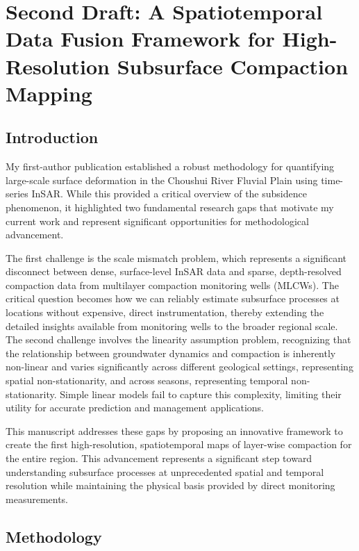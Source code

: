 \documentclass[12pt, a4paper]{article}
\begin{document}
	\section{Second Draft: A Spatiotemporal Data Fusion Framework for High-Resolution Subsurface Compaction Mapping}
	
	\subsection{Introduction}
	
	My first-author publication established a robust methodology for quantifying large-scale surface deformation in the Choushui River Fluvial Plain using time-series InSAR. While this provided a critical overview of the subsidence phenomenon, it highlighted two fundamental research gaps that motivate my current work and represent significant opportunities for methodological advancement.
	
	The first challenge is the scale mismatch problem, which represents a significant disconnect between dense, surface-level InSAR data and sparse, depth-resolved compaction data from multilayer compaction monitoring wells (MLCWs). The critical question becomes how we can reliably estimate subsurface processes at locations without expensive, direct instrumentation, thereby extending the detailed insights available from monitoring wells to the broader regional scale. The second challenge involves the linearity assumption problem, recognizing that the relationship between groundwater dynamics and compaction is inherently non-linear and varies significantly across different geological settings, representing spatial non-stationarity, and across seasons, representing temporal non-stationarity. Simple linear models fail to capture this complexity, limiting their utility for accurate prediction and management applications.
	
	This manuscript addresses these gaps by proposing an innovative framework to create the first high-resolution, spatiotemporal maps of layer-wise compaction for the entire region. This advancement represents a significant step toward understanding subsurface processes at unprecedented spatial and temporal resolution while maintaining the physical basis provided by direct monitoring measurements.
	
	\subsection{Methodology}
	
\end{document}
